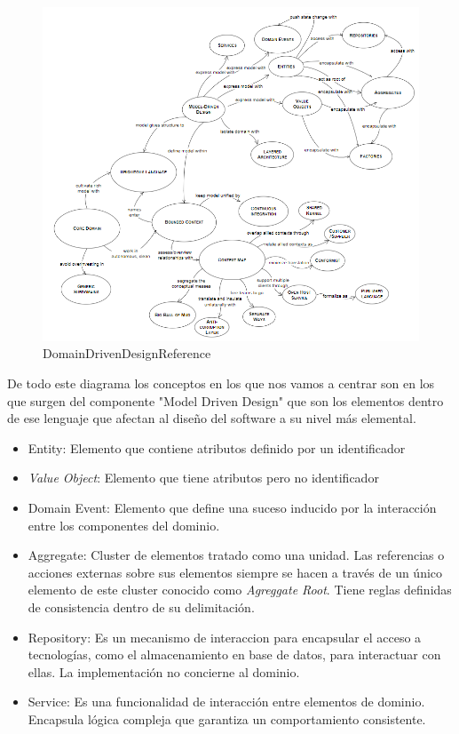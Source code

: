 \begin{figure}[H]
    \centering
    \includegraphics[height=0.5\textheight]{./part/Proyecto_ejecutivo/memoria_descriptiva/infoPreviaAntecedentes/img/DomainDrivenDesignReference}
    \caption{DomainDrivenDesignReference\cite{EricEvans2003DDTC}}\label{fig:DomainDrivenDesignReference}
\end{figure}

De todo este diagrama los conceptos en los que nos vamos a centrar son en los que surgen del componente "Model Driven Design" que son los elementos dentro de ese lenguaje que afectan al diseño del software a su nivel más elemental.

\begin{itemize}
    \item Entity: Elemento que contiene atributos definido por un identificador
    \item \textit{Value Object}: Elemento que tiene atributos pero no identificador
    \item Domain Event: Elemento que define una suceso inducido por la interacción entre los componentes del dominio.
    \item Aggregate: Cluster de elementos tratado como una unidad. Las referencias o acciones externas sobre sus elementos siempre se hacen a través de un único elemento de este cluster conocido como \textit{Agreggate Root}. Tiene reglas definidas de consistencia dentro de su delimitación.
    \item Repository: Es un mecanismo de interaccion para encapsular el acceso a tecnologías, como el almacenamiento en base de datos, para interactuar con ellas. La implementación no concierne al dominio.
    \item Service: Es una funcionalidad de interacción entre elementos de dominio. Encapsula lógica compleja que garantiza un comportamiento consistente.
\end{itemize}

